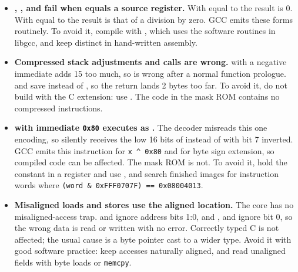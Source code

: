 \documentclass[11pt,pdftex,portrait,letterpaper]{article}
\begin{document}
\begin{itemize}
	Measurements taken while the loop oscillates are not valid: RE is not held at the
	programmed potential and the mirrored current does not track the cell current, so both
	the applied potential and the digitised current are wrong. Chronoamperometry and
	cyclic voltammetry data acquired in this condition must be discarded. No register
	trims the control-amplifier compensation ---  and
	 act on $A_2$ --- so there is no workaround on this silicon.

	\item \textbf{, ,  and  fail when  equals a source register.}
	With  equal to  the result is 0. With  equal to
	 the result is that of a division by zero. GCC emits these forms routinely.
	To avoid it, compile with , which uses the software routines in
	libgcc, and keep  distinct in hand-written assembly.

	\item \textbf{Compressed stack adjustments and calls are wrong.}
	 with a negative immediate adds 15 too much, so  is
	wrong after a normal function prologue.  and  save
	 instead of , so the return lands 2 bytes too far. To avoid
	it, do not build with the C extension: use .
	The code in the mask ROM contains no compressed instructions.

	\item \textbf{ with immediate \texttt{0x80} executes as .}
	The decoder misreads this one encoding, so  silently receives the low 16
	bits of  instead of  with bit 7 inverted. GCC emits this
	instruction for \texttt{x \^{} 0x80} and for byte sign extension, so compiled code can be
	affected. The mask ROM is not. To avoid it, hold the constant in a register and use
	, and search finished images for instruction words where
	\texttt{(word \& 0xFFF0707F) == 0x08004013}.

	\item \textbf{Misaligned loads and stores use the aligned location.}
	The core has no misaligned-access trap.  and  ignore address
	bits 1:0, and ,  and  ignore bit 0, so the
	wrong data is read or written with no error. Correctly typed C is not affected; the usual
	cause is a byte pointer cast to a wider type. Avoid it with good software practice: keep
	accesses naturally aligned, and read unaligned fields with byte loads or \texttt{memcpy}.


\end{itemize}
\end{document}
